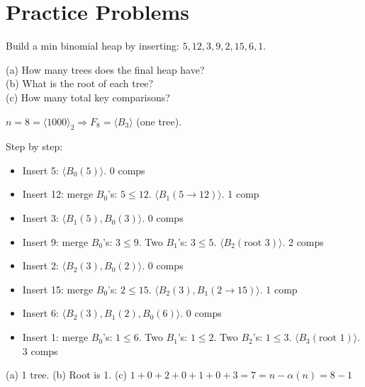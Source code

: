 \documentclass[11pt]{article}
\begin{document}
\section{Practice Problems}

\begin{examplebox}
Build a min binomial heap by inserting: $5, 12, 3, 9, 2, 15, 6, 1$.

(a) How many trees does the final heap have?\\
(b) What is the root of each tree?\\
(c) How many total key comparisons?

\begin{answerband}
$n = 8 = \langle 1000 \rangle_2 \Rightarrow F_8 = \langle B_3 \rangle$ (one tree).

Step by step:
\begin{itemize}[leftmargin=1.4em,itemsep=1pt]
  \item Insert 5: $\langle B_0(5) \rangle$. \hfill 0 comps
  \item Insert 12: merge $B_0$'s: $5 \le 12$. $\langle B_1(5 \to 12) \rangle$. \hfill 1 comp
  \item Insert 3: $\langle B_1(5), B_0(3) \rangle$. \hfill 0 comps
  \item Insert 9: merge $B_0$'s: $3 \le 9$. Two $B_1$'s: $3 \le 5$. $\langle B_2(\text{root } 3) \rangle$. \hfill 2 comps
  \item Insert 2: $\langle B_2(3), B_0(2) \rangle$. \hfill 0 comps
  \item Insert 15: merge $B_0$'s: $2 \le 15$. $\langle B_2(3), B_1(2 \to 15) \rangle$. \hfill 1 comp
  \item Insert 6: $\langle B_2(3), B_1(2), B_0(6) \rangle$. \hfill 0 comps
  \item Insert 1: merge $B_0$'s: $1 \le 6$. Two $B_1$'s: $1 \le 2$. Two $B_2$'s: $1 \le 3$. $\langle B_3(\text{root } 1) \rangle$. \hfill 3 comps
\end{itemize}

(a) \textcolor{violetT}{1 tree.} \quad (b) \textcolor{violetT}{Root is 1.} \quad (c) \textcolor{violetT}{$1+0+2+0+1+0+3 = 7 = n - \alpha(n) = 8 - 1$}
\end{answerband}
\end{examplebox}
\end{document}
